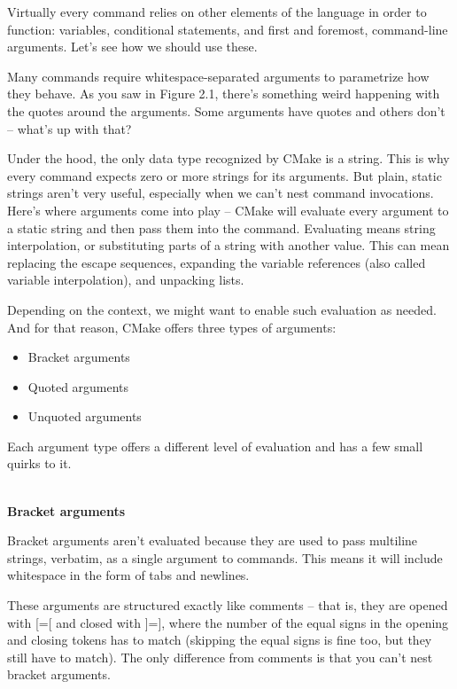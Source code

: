 Virtually every command relies on other elements of the language in order to function: variables, conditional statements, and first and foremost, command-line arguments. Let's see how we should use these.


Many commands require whitespace-separated arguments to parametrize how they behave. As you saw in Figure 2.1, there's something weird happening with the quotes around the arguments. Some arguments have quotes and others don't – what's up with that?

Under the hood, the only data type recognized by CMake is a string. This is why every command expects zero or more strings for its arguments. But plain, static strings aren't very useful, especially when we can't nest command invocations. Here's where arguments come into play – CMake will evaluate every argument to a static string and then pass them into the command. Evaluating means string interpolation, or substituting parts of a string with another value. This can mean replacing the escape sequences, expanding the variable references (also called variable interpolation), and unpacking lists.

Depending on the context, we might want to enable such evaluation as needed. And for that reason, CMake offers three types of arguments:

\begin{itemize}
\item 
Bracket arguments

\item 
Quoted arguments

\item 
Unquoted arguments
\end{itemize}

Each argument type offers a different level of evaluation and has a few small quirks to it.

\hspace*{\fill} \\ %
\noindent
\textbf{Bracket arguments}

Bracket arguments aren't evaluated because they are used to pass multiline strings, verbatim, as a single argument to commands. This means it will include whitespace in the form of tabs and newlines.

These arguments are structured exactly like comments – that is, they are opened with [=[ and closed with ]=], where the number of the equal signs in the opening and closing tokens has to match (skipping the equal signs is fine too, but they still have to match). The only difference from comments is that you can't nest bracket arguments.


